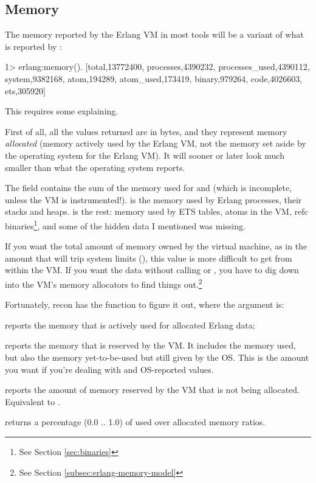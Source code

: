 \documentclass[11pt, oneside]{book}   	%
\begin{document}
\subsection{Memory}

The memory reported by the Erlang VM in most tools will be a variant of what is reported by :

\begin{VerbatimEshell}
1> erlang:memory().
[{total,13772400},
 {processes,4390232},
 {processes_used,4390112},
 {system,9382168},
 {atom,194289},
 {atom_used,173419},
 {binary,979264},
 {code,4026603},
 {ets,305920}]
\end{VerbatimEshell}

This requires some explaining.

First of all, all the values returned are in bytes, and they represent memory \emph{allocated} (memory actively used by the Erlang VM, not the memory set aside by the operating system for the Erlang VM). It will sooner or later look much smaller than what the operating system reports.

The  field contains the sum of the memory used for  and  (which is incomplete, unless the VM is instrumented!).  is the memory used by Erlang processes, their stacks and heaps.  is the rest: memory used by ETS tables, atoms in the VM, refc binaries\footnote{See Section \ref{sec:binaries}}, and some of the hidden data I mentioned was missing.

If you want the total amount of memory owned by the virtual machine, as in the amount that will trip system limits (), this value is more difficult to get from within the VM. If you want the data without calling  or , you have to dig down into the VM's memory allocators to find things out.\footnote{See Section \ref{subsec:erlang-memory-model}}

Fortunately, recon has the function  to figure it out, where the argument is:

\begin{itemize*}
	\item {} reports the memory that is actively used for allocated Erlang data;
   	\item {} reports the memory that is reserved by the VM. It includes the memory used, but also the memory yet-to-be-used but still given by the OS. This is the amount you want if you're dealing with  and OS-reported values.
	\item {} reports the amount of memory reserved by the VM that is not being allocated. Equivalent to .
	\item {} returns a percentage (0.0 .. 1.0) of used over allocated memory ratios.
\end{itemize*}
\end{document}
